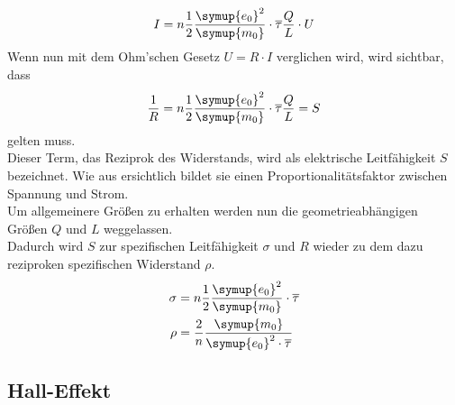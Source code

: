 \begin{equation}
  I=n\frac{1}{2}\frac{\symup{e_0}^2}{\symup{m_0}}\cdot \overline{\tau} \frac{Q}{L} \cdot U
  \label{eqn:ohm1}
\end{equation}
Wenn nun  mit dem Ohm'schen Gesetz $U=R\cdot I$ verglichen wird, wird sichtbar, dass 
\begin{equation}
  \frac{1}{R}=n\frac{1}{2}\frac{\symup{e_0}^2}{\symup{m_0}}\cdot \overline{\tau} \frac{Q}{L} = S\nonumber
\end{equation}
gelten muss.\\
Dieser Term, das Reziprok des Widerstands, wird als elektrische Leitfähigkeit $S$ bezeichnet. Wie aus  ersichtlich bildet
sie einen Proportionalitätsfaktor zwischen Spannung und Strom.\\
Um allgemeinere Größen zu erhalten werden nun die geometrieabhängigen Größen $Q$ und $L$ weggelassen.\\
Dadurch wird $S$ zur spezifischen Leitfähigkeit $\sigma$ und $R$ wieder zu dem dazu reziproken spezifischen Widerstand $\rho$.
\begin{align}
  \sigma&=n\frac{1}{2}\frac{\symup{e_0}^2}{\symup{m_0}} \cdot \overline{\tau} \label{eqn:sigma}\\
  \rho &=\frac{2}{n}\frac{\symup{m_0}}{\symup{e_0}^2 \cdot \overline{\tau}}  \label{eqn:rho}
\end{align}



\subsection{Hall-Effekt}


